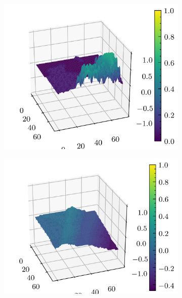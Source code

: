 \documentclass[../document.tex]{subfiles}
\begin{document}
\begin{figure}[H]
    \begin{subfigure}[b]{0.19\textwidth}
        \includegraphics[width=\linewidth]{../img/5/quarry/false_positive/patch-3d-0.png}
    \end{subfigure}
    \begin{subfigure}[b]{0.19\textwidth}
        \includegraphics[width=\linewidth]{../img/5/quarry/false_positive/patch-3d-1.png}
    \end{subfigure}  
    \begin{subfigure}[b]{0.19\textwidth}

\end{subfigure}
\end{figure}
\end{document}
